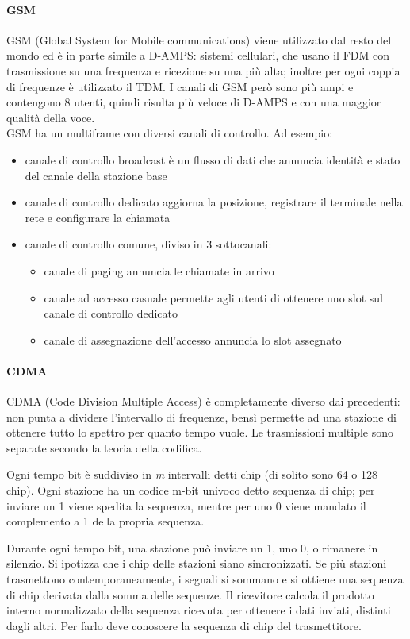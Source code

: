\paragraph{GSM}
GSM (Global System for Mobile communications) viene utilizzato dal resto del mondo ed è in parte simile a D-AMPS:
sistemi cellulari, che usano il FDM con trasmissione su una frequenza e ricezione su una più alta;
inoltre per ogni coppia di frequenze è utilizzato il TDM.
I canali di GSM però sono più ampi e contengono 8 utenti, quindi risulta più veloce di D-AMPS e con una maggior qualità della voce.\\
GSM ha un multiframe con diversi canali di controllo. Ad esempio:
\begin{itemize}
\item canale di controllo broadcast è un flusso di dati che annuncia identità e stato del canale della stazione base
\item canale di controllo dedicato aggiorna la posizione, registrare il terminale nella rete e configurare la chiamata
\item canale di controllo comune, diviso in 3 sottocanali:
\begin{itemize}
\item canale di paging annuncia le chiamate in arrivo
\item canale ad accesso casuale permette agli utenti di ottenere uno slot sul canale di controllo dedicato
\item canale di assegnazione dell'accesso annuncia lo slot assegnato
\end{itemize}
\end{itemize}

\paragraph{CDMA}
CDMA (Code Division Multiple Access) è completamente diverso dai precedenti: 
non punta a dividere l'intervallo di frequenze, bensì permette ad una stazione di ottenere tutto lo spettro per quanto tempo vuole.
Le trasmissioni multiple sono separate secondo la teoria della codifica.

Ogni tempo bit è suddiviso in \textit{m} intervalli detti chip (di solito sono 64 o 128 chip). 
Ogni stazione ha un codice m-bit univoco detto sequenza di chip;
per inviare un 1 viene spedita la sequenza, mentre per uno 0 viene mandato il complemento a 1 della propria sequenza.

Durante ogni tempo bit, una stazione può inviare un 1, uno 0, o rimanere in silenzio.
Si ipotizza che i chip delle stazioni siano sincronizzati.
Se più stazioni trasmettono contemporaneamente, i segnali si sommano e si ottiene una sequenza di chip derivata dalla somma delle sequenze.
Il ricevitore calcola il prodotto interno normalizzato della sequenza ricevuta per ottenere i dati inviati, distinti dagli altri.
Per farlo deve conoscere la sequenza di chip del trasmettitore.




